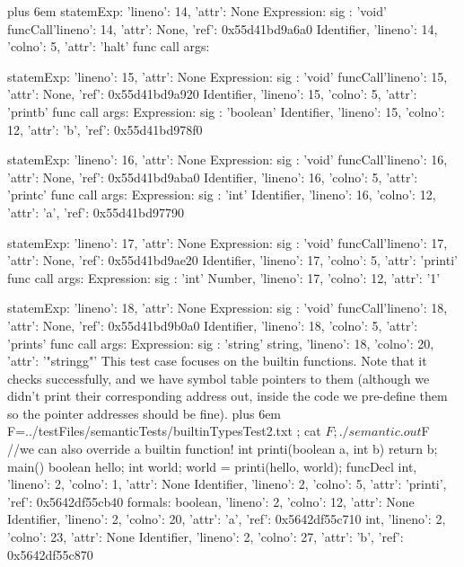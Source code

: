 \documentclass{article}
\makeatletter
\newenvironment{myverb}
 {\def\@xobeysp{\ }\verbatim\rightskip=0pt plus 6em\relax}
 {\endverbatim}
\makeatother
\begin{document}
\begin{itemize}
\begin{myverb}
      statemExp: {'lineno': 14, 'attr': None}
        Expression: {sig : 'void'}
          funcCall{'lineno': 14, 'attr': None, 'ref': 0x55d41bd9a6a0}
            Identifier, {'lineno': 14, 'colno': 5, 'attr': 'halt'}
            func call args:


      statemExp: {'lineno': 15, 'attr': None}
        Expression: {sig : 'void'}
          funcCall{'lineno': 15, 'attr': None, 'ref': 0x55d41bd9a920}
            Identifier, {'lineno': 15, 'colno': 5, 'attr': 'printb'}
            func call args:
              Expression: {sig : 'boolean'}
                Identifier, {'lineno': 15, 'colno': 12, 'attr': 'b', 'ref': 0x55d41bd978f0}


      statemExp: {'lineno': 16, 'attr': None}
        Expression: {sig : 'void'}
          funcCall{'lineno': 16, 'attr': None, 'ref': 0x55d41bd9aba0}
            Identifier, {'lineno': 16, 'colno': 5, 'attr': 'printc'}
            func call args:
              Expression: {sig : 'int'}
                Identifier, {'lineno': 16, 'colno': 12, 'attr': 'a', 'ref': 0x55d41bd97790}


      statemExp: {'lineno': 17, 'attr': None}
        Expression: {sig : 'void'}
          funcCall{'lineno': 17, 'attr': None, 'ref': 0x55d41bd9ae20}
            Identifier, {'lineno': 17, 'colno': 5, 'attr': 'printi'}
            func call args:
              Expression: {sig : 'int'}
                Number, {'lineno': 17, 'colno': 12, 'attr': '1'}


      statemExp: {'lineno': 18, 'attr': None}
        Expression: {sig : 'void'}
          funcCall{'lineno': 18, 'attr': None, 'ref': 0x55d41bd9b0a0}
            Identifier, {'lineno': 18, 'colno': 5, 'attr': 'prints'}
            func call args:
              Expression: {sig : 'string'}
                string, {'lineno': 18, 'colno': 20, 'attr': '"stringg"'}
\end{myverb}
This test case focuses on the builtin functions. Note that it checks successfully, and we have symbol table pointers to them (although we didn't print their corresponding address out, inside the code we pre-define them so the pointer addresses should be fine).
\begin{myverb}
F=../testFiles/semanticTests/builtinTypesTest2.txt ; cat $F; ./semantic.out $F
//we can also override a builtin function!
int printi(boolean a, int b){ return b;}
main(){
    boolean hello;
    int world;
    world = printi(hello, world);
}
funcDecl
    int, {'lineno': 2, 'colno': 1, 'attr': None}
    Identifier, {'lineno': 2, 'colno': 5, 'attr': 'printi', 'ref': 0x5642df55cb40}
      formals:
        boolean, {'lineno': 2, 'colno': 12, 'attr': None}
        Identifier, {'lineno': 2, 'colno': 20, 'attr': 'a', 'ref': 0x5642df55c710}
        int, {'lineno': 2, 'colno': 23, 'attr': None}
        Identifier, {'lineno': 2, 'colno': 27, 'attr': 'b', 'ref': 0x5642df55c870}


\end{myverb}
\end{itemize}
\end{document}
